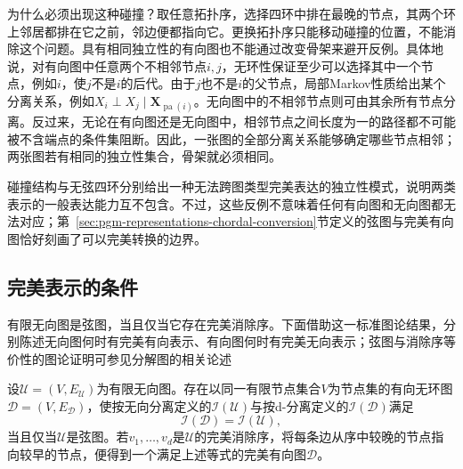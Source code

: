 为什么必须出现这种碰撞？取任意拓扑序，选择四环中排在最晚的节点，其两个环上邻居都排在它之前，邻边便都指向它。更换拓扑序只能移动碰撞的位置，不能消除这个问题。具有相同独立性的有向图也不能通过改变骨架来避开反例。具体地说，对有向图中任意两个不相邻节点$i,j$，无环性保证至少可以选择其中一个节点，例如$i$，使$j$不是$i$的后代。由于$j$也不是$i$的父节点，局部Markov性质给出某个分离关系，例如$X_i\perp X_j\mid\bm{X}_{\operatorname{pa}(i)}$。无向图中的不相邻节点则可由其余所有节点分离。反过来，无论在有向图还是无向图中，相邻节点之间长度为一的路径都不可能被不含端点的条件集阻断。因此，一张图的全部分离关系能够确定哪些节点相邻；两张图若有相同的独立性集合，骨架就必须相同。

碰撞结构与无弦四环分别给出一种无法跨图类型完美表达的独立性模式，说明两类表示的一般表达能力互不包含。不过，这些反例不意味着任何有向图和无向图都无法对应；第~\ref{sec:pgm-representations-chordal-conversion}节定义的弦图与完美有向图恰好刻画了可以完美转换的边界。

\subsection{完美表示的条件}
\label{sec:pgm-representations-perfect-dags}

有限无向图是弦图，当且仅当它存在完美消除序。下面借助这一标准图论结果，分别陈述无向图何时有完美有向表示、有向图何时有完美无向表示；弦图与消除序等价性的图论证明可参见分解图的相关论述

\begin{theorem}[无向图的完美有向图表示]
  \label{thm:pgm-representations-chordal-perfect}
  设$\mathcal{U}=(V,E_{\mathcal U})$为有限无向图。存在以同一有限节点集合$V$为节点集的有向无环图$\mathcal{D}=(V,E_{\mathcal D})$，使按无向分离定义的$\mathcal{I}(\mathcal{U})$与按d-分离定义的$\mathcal{I}(\mathcal{D})$满足
  \[
    \mathcal{I}(\mathcal{D})=\mathcal{I}(\mathcal{U}),
  \]
  当且仅当$\mathcal{U}$是弦图。若$v_1,\ldots,v_d$是$\mathcal{U}$的完美消除序，将每条边从序中较晚的节点指向较早的节点，便得到一个满足上述等式的完美有向图$\mathcal{D}$。
\end{theorem}

